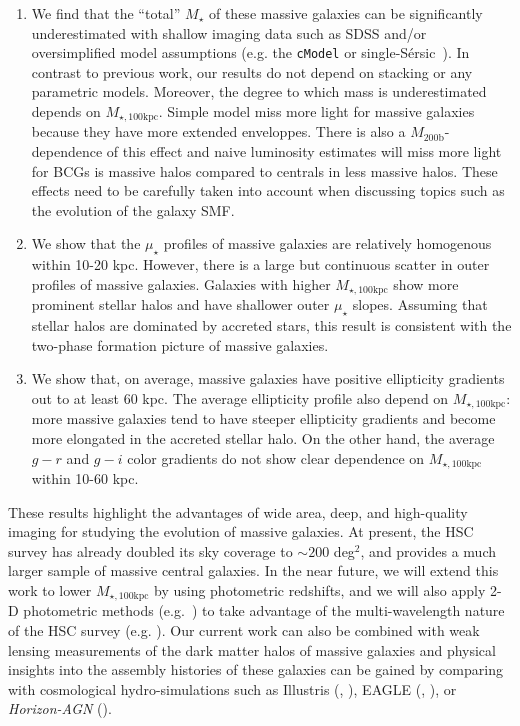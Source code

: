 \documentclass[a4paper,fleqn,usenatbib]{mnras}
\def\ser{{S\'{e}rsic\ }}
\def\mstar{{$M_{\star}$}}
\def\mhalo{{$M_{\mathrm{200b}}$}}
\def\mtot{{$M_{\star,100\mathrm{kpc}}$}}
\def\mden{{$\mu_{\star}$}}
\begin{document}
    \begin{enumerate}
        \item We find that the ``total'' \mstar{} of these massive galaxies can be 
            significantly underestimated with shallow imaging data such as SDSS and/or 
            oversimplified model assumptions (e.g. the \texttt{cModel} or single-\ser{}). 
            In contrast to previous work, our results do not depend on stacking or any 
            parametric models. 
            Moreover, the degree to which mass is underestimated depends on \mtot{}. Simple model miss more light for massive galaxies because they have more extended enveloppes. There is also a \mhalo{}-dependence of this effect and naive luminosity estimates will  miss more light for BCGs is massive halos compared to centrals in less massive halos. These effects need to be carefully taken into account when discussing topics such as the evolution of the galaxy SMF.     
        \item We show that the \mden{} profiles of massive galaxies are relatively homogenous  within 10-20 kpc. However, there is a large but continuous scatter in outer profiles of massive galaxies. Galaxies with higher \mtot{} show more prominent stellar halos and have 
            shallower outer \mden{} slopes. 
            Assuming that stellar halos are dominated by accreted stars, this result is consistent with the two-phase formation picture of massive galaxies. 
        \item We show that, on average, massive galaxies have positive ellipticity 
            gradients out to at least 60 kpc. 
            The average ellipticity profile also depend on \mtot{}: more massive 
            galaxies tend to have steeper ellipticity gradients and become more 
            elongated in the accreted stellar halo. 
            On the other hand, the average $g-r$ and $g-i$ color gradients do not 
            show clear dependence on \mtot{} within 10-60 kpc.      
    \end{enumerate}

    These results highlight the advantages of wide area, deep, and high-quality imaging 
    for studying the evolution of massive galaxies. 
    At present, the HSC survey has already doubled its sky coverage to 
    ${\sim} 200$ deg$^2$, and provides a much larger sample of massive central galaxies. 
    In the near future, we will extend this work to lower \mtot{} by using photometric 
    redshifts, and we will also apply 2-D photometric methods (e.g.\ \citealt{Huang2013a}) 
    to take advantage of the multi-wavelength nature of the HSC survey 
    (e.g. \citealt{Huang2016}). 
    Our current work can also be combined with weak lensing measurements of the dark 
    matter halos of massive galaxies and physical insights into the assembly histories 
    of these galaxies can be gained by comparing with cosmological hydro-simulations 
    such as Illustris (\citealt{Vogelsberger2014}, \citealt{Genel2014}), 
    EAGLE (\citealt{Schaye2015}, \citealt{Crain2015}), or \textit{Horizon-AGN} 
    (\citealt{Dubois2014}).
\end{document}
